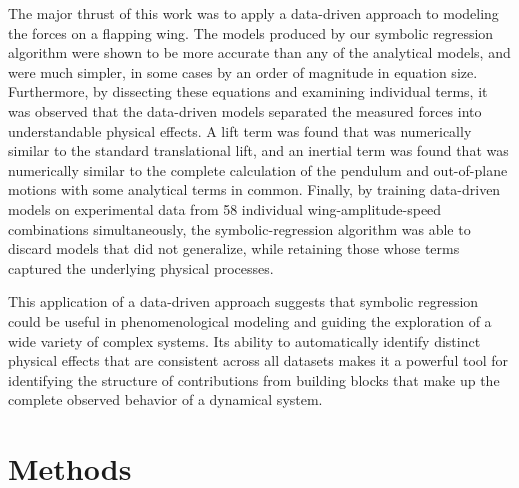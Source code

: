 \documentclass{article}
\begin{document}
The major thrust of this work was to apply a data-driven approach to modeling
the forces on a flapping wing.  The models produced by our symbolic regression
algorithm were shown to be more accurate than any of the analytical models, and
were much simpler, in some cases by an order of magnitude in equation size.
Furthermore, by dissecting these equations and examining individual terms, it
was observed that the data-driven models separated the measured forces into
understandable physical effects.  A lift term was found that was numerically
similar to the standard translational lift, and an inertial term was found that
was numerically similar to the complete calculation of the pendulum and
out-of-plane motions with some analytical terms in common.  Finally, by
training data-driven models on experimental data from 58 individual
wing-amplitude-speed combinations simultaneously, the symbolic-regression
algorithm was able to discard models that did not generalize, while retaining
those whose terms captured the underlying physical processes.

This application of a data-driven approach suggests that symbolic regression
could be useful in phenomenological modeling and guiding the exploration of a
wide variety of complex systems.  Its ability to automatically identify
distinct physical effects that are consistent across all datasets makes it a
powerful tool for identifying the structure of contributions from building
blocks that make up the complete observed behavior of a dynamical system.

\section*{Methods}

\end{document}
